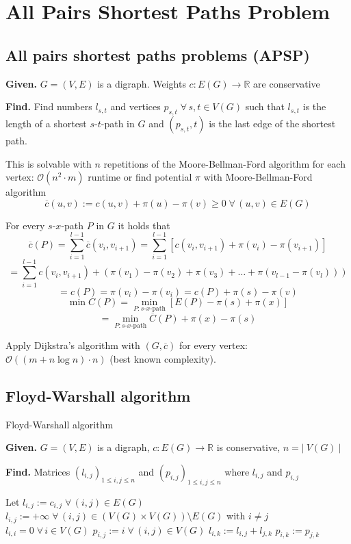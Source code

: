 \documentclass[a4paper]{article}
\theoremstyle{definition}
\newcommand{\card}[1]{\left|\:\!#1\:\!\right|}
\newcommand{\given}[1]{\textbf{Given.} #1\par}
\newcommand{\find}[1]{\textbf{Find.} #1\par}
\newcommand{\gath}[2]{$#1$-$#2$-path} %
\newcommand{\fall}{\;\forall\,}
\begin{document}
\section{All Pairs Shortest Paths Problem}
%
\subsection{All pairs shortest paths problems (APSP)}
%
\given{$G = (V, E)$ is a digraph. Weights $c: E(G) \rightarrow \mathbb{R}$ are conservative}
\find{Find numbers $l_{s,t}$ and vertices $p_{s,t} \fall s, t \in V(G)$ such that $l_{s,t}$ is the length of a shortest \gath st in $G$ and $(p_{s,t}, t)$ is the last edge of the shortest path.}

This is solvable with $n$ repetitions of the Moore-Bellman-Ford algorithm for each vertex: $\mathcal{O}(n^2 \cdot m)$ runtime or find potential $\pi$ with Moore-Bellman-Ford algorithm
\[
  \overline{c}(u,v) := c(u,v) + \pi(u) - \pi(v) \geq 0 \fall (u, v) \in E(G)
\]

For every \gath sx $P$ in $G$ it holds that
\[
  \overline{c}(P)
    = \sum_{i=1}^{l-1} \overline{c}(v_i, v_{i+1})
    = \sum_{i=1}^{l-1} [c(v_i, v_{i+1}) + \pi(v_i) - \pi(v_{i+1})]
\] \[
  = \sum_{i=1}^{l-1} c(v_i, v_{i+1}) + (\pi(v_1) - \pi(v_2) + \pi(v_3) + \ldots + \pi(v_{l-1} - \pi(v_l)))
\] \[
  = c(P) = \pi(v_i) - \pi(v_i) = c(P) + \pi(s) - \pi(v)
\] \[
  \min{C(P)} = \min_{P: \text{\gath sx}} \left[E(P) - \pi(s) + \pi(x)\right]
\] \[
  = \min_{P: \text{\gath sx}} \overline{C}(P) + \pi(x) - \pi(s)
\]

Apply Dijkstra's algorithm with $(G, \overline{c})$ for every vertex: $\mathcal{O}((m + n \log{n}) \cdot n)$ (best known complexity).

\subsection{Floyd-Warshall algorithm}
%
\begin{algorithm}
  \caption{Floyd-Warshall algorithm}
  \label{fw-algo}
  \given{$G = (V, E)$ is a digraph, $c: E(G) \rightarrow \mathbb{R}$ is conservative, $n = \card{V(G)}$}
  \find{Matrices $(l_{i,j})_{1 \leq i,j \leq n}$ and $(p_{i,j})_{1 \leq i,j \leq n}$ where $l_{i,j}$ and $p_{i,j}$}
\begin{algorithmic}[1]
  \State Let $l_{i,j} := c_{i,j} \fall (i,j) \in E(G)$
  \State $l_{i,j} := +\infty \fall (i,j) \in (V(G) \times V(G)) \setminus E(G)$ with $i \neq j$
  \State $l_{i,i} = 0 \fall i \in V(G)$
  \State $p_{i,j} := i \fall (i,j) \in V(G)$
              \State $l_{i,k} := l_{i,j} + l_{j,k}$
              \State $p_{i,k} := p_{j,k}$
            \EndIf
          \EndIf
        \EndFor
      \EndIf
    \EndFor
  \EndFor
\end{algorithmic}
\end{algorithm}
\end{document}
